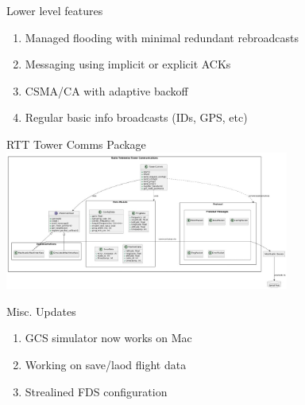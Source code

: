 \begin{frame}{Lower level features}
    \begin{enumerate}
        \item Managed flooding with minimal redundant rebroadcasts
        \item Messaging using implicit or explicit ACKs
        \item CSMA/CA with adaptive backoff
        \item Regular basic info broadcasts (IDs, GPS, etc)
    \end{enumerate}
\end{frame}

\begin{frame}{RTT Tower Comms Package}
    \centering
    \includegraphics[height=0.7\textheight,width=0.7\textwidth,keepaspectratio]{images/rtt/tower_comms.jpg}
\end{frame}

\begin{frame}{Misc. Updates}
    \begin{enumerate}
        \item GCS simulator now works on Mac
        \item Working on save/laod flight data
        \item Strealined FDS configuration
    \end{enumerate}
\end{frame}